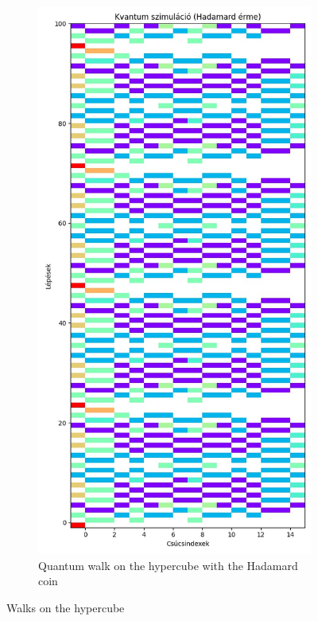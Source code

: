 \begin{figure}[H]
\begin{subfigure}{.45\linewidth}
  \end{subfigure}
  \begin{subfigure}{.45\linewidth}
    \centering
    \includegraphics[width=\linewidth]{./figures/results/hypercube/hadamard.jpg}
    \caption{Quantum walk on the hypercube with the Hadamard coin}
  \end{subfigure}
  \caption{Walks on the hypercube}
  \label{fig:all}
\end{figure}

